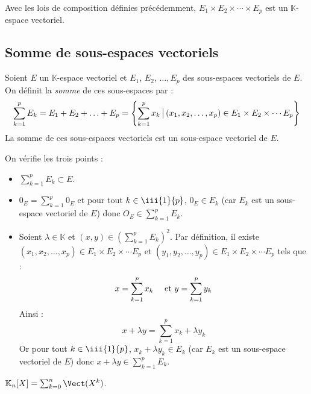 \documentclass[french,11pt,twoside]{VcCours}
\newcommand{\Sum}[2]{\sum_{#1}^{#2}}
\begin{document}
\begin{Proposition}{}
Avec les lois de composition définies précédemment, $E_1 \times E_2 \times \cdots \times E_p$ est un $\mathbb{K}$-espace vectoriel.
\end{Proposition}







\subsection{Somme de sous-espaces vectoriels}

\begin{TheoremeDefinition}{}
Soient $E$ un $\mathbb{K}$-espace vectoriel et $E_1$, $E_2$, $\ldots, E_p$ des sous-espaces vectoriels de $E$. On définit la \emph{somme} de ces sous-espaces par :
$$ \sum_{k=1}^p E_k = E_1 + E_2 + \ldots + E_p = {\left\lbrace \sum_{k=1}^p x_k \, \big{\vert} \, (x_1, x_2, \ldots, x_p) \in E_1 \times E_2 \times \cdots E_p \right\rbrace}$$
La somme de ces sous-espaces vectoriels est un sous-espace vectoriel de $E$.
\end{TheoremeDefinition}

\begin{Demonstration}{}
On vérifie les trois points :
\begin{itemize}
\item $\Sum{k=1}{p} E_k \subset E$.
\item $0_E = \Sum{k=1}{p} 0_E$ et pour tout $k \in \iii{1}{p}$, $0_E \in E_k$ (car $E_k$ est un sous-espace vectoriel de $E$) donc $O_E \in \Sum{k=1}{p} E_k$.
\item Soient $\lambda \in \mathbb{K}$ et $(x,y) \in \left(\Sum{k=1}{p} E_k\right)^2$. Par définition, il existe $(x_1, x_2, \ldots, x_p) \in E_1 \times E_2 \times \cdots E_p$ et $(y_1, y_2, \ldots, y_p) \in E_1 \times E_2 \times \cdots E_p$ tels que :
$$ x = \sum_{k=1}^p x_k \quad \hbox{ et } y = \sum_{k=1}^p y_k $$
Ainsi :
$$ x+ \lambda y =  \sum_{k=1}^p x_k+ \lambda y_k $$
Or pour tout $k \in \iii{1}{p}$, $x_k+ \lambda y_k  \in E_k$ (car $E_k$ est un sous-espace vectoriel de $E$) donc $x+ \lambda y \in \Sum{k=1}{p} E_k$.
\end{itemize}



\end{Demonstration}

\begin{Exemple} $\mathbb{K}_n[X] = \Sum{k=0}{n} \Vect(X^k)$.
\end{Exemple}
\end{document}
